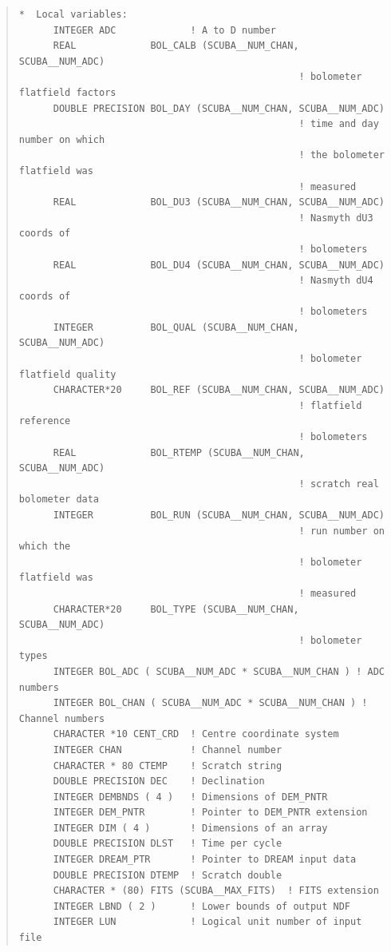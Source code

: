 \documentclass[twoside,11pt]{article}
\newenvironment{myquote}{\begin{quote}\begin{small}}{\end{small}\end{quote}}
\renewcommand{\_}{\texttt{\symbol{95}}}
\begin{document}
\begin{myquote}
\begin{verbatim}
*  Local variables:
      INTEGER ADC             ! A to D number
      REAL             BOL_CALB (SCUBA__NUM_CHAN, SCUBA__NUM_ADC)
                                                 ! bolometer flatfield factors
      DOUBLE PRECISION BOL_DAY (SCUBA__NUM_CHAN, SCUBA__NUM_ADC)
                                                 ! time and day number on which
                                                 ! the bolometer flatfield was
                                                 ! measured
      REAL             BOL_DU3 (SCUBA__NUM_CHAN, SCUBA__NUM_ADC)
                                                 ! Nasmyth dU3 coords of 
                                                 ! bolometers
      REAL             BOL_DU4 (SCUBA__NUM_CHAN, SCUBA__NUM_ADC)
                                                 ! Nasmyth dU4 coords of 
                                                 ! bolometers
      INTEGER          BOL_QUAL (SCUBA__NUM_CHAN, SCUBA__NUM_ADC)
                                                 ! bolometer flatfield quality
      CHARACTER*20     BOL_REF (SCUBA__NUM_CHAN, SCUBA__NUM_ADC)
                                                 ! flatfield reference
                                                 ! bolometers
      REAL             BOL_RTEMP (SCUBA__NUM_CHAN, SCUBA__NUM_ADC)
                                                 ! scratch real bolometer data
      INTEGER          BOL_RUN (SCUBA__NUM_CHAN, SCUBA__NUM_ADC)
                                                 ! run number on which the
                                                 ! bolometer flatfield was
                                                 ! measured
      CHARACTER*20     BOL_TYPE (SCUBA__NUM_CHAN, SCUBA__NUM_ADC)
                                                 ! bolometer types
      INTEGER BOL_ADC ( SCUBA__NUM_ADC * SCUBA__NUM_CHAN ) ! ADC numbers
      INTEGER BOL_CHAN ( SCUBA__NUM_ADC * SCUBA__NUM_CHAN ) ! Channel numbers
      CHARACTER *10 CENT_CRD  ! Centre coordinate system
      INTEGER CHAN            ! Channel number
      CHARACTER * 80 CTEMP    ! Scratch string
      DOUBLE PRECISION DEC    ! Declination
      INTEGER DEMBNDS ( 4 )   ! Dimensions of DEM_PNTR
      INTEGER DEM_PNTR        ! Pointer to DEM_PNTR extension
      INTEGER DIM ( 4 )       ! Dimensions of an array
      DOUBLE PRECISION DLST   ! Time per cycle
      INTEGER DREAM_PTR       ! Pointer to DREAM input data
      DOUBLE PRECISION DTEMP  ! Scratch double
      CHARACTER * (80) FITS (SCUBA__MAX_FITS)  ! FITS extension
      INTEGER LBND ( 2 )      ! Lower bounds of output NDF
      INTEGER LUN             ! Logical unit number of input file

\end{verbatim}
\end{myquote}
\end{document}
